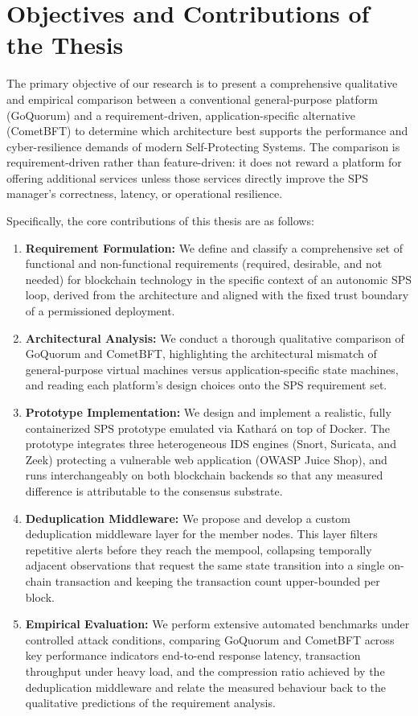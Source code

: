 \section{Objectives and Contributions of the Thesis}
\label{sec:intro_objectives}

The primary objective of our research is to present a comprehensive qualitative and empirical comparison between a conventional general-purpose platform (GoQuorum) and a requirement-driven, application-specific alternative (CometBFT) to determine which architecture best supports the performance and cyber-resilience demands of modern Self-Protecting Systems. The comparison is requirement-driven rather than feature-driven: it does not reward a platform for offering additional services unless those services directly improve the SPS manager's correctness, latency, or operational resilience.

Specifically, the core contributions of this thesis are as follows:
\begin{enumerate}
    \item \textbf{Requirement Formulation:} We define and classify a comprehensive set of functional and non-functional requirements (required, desirable, and not needed) for blockchain technology in the specific context of an autonomic SPS loop, derived from the architecture and aligned with the fixed trust boundary of a permissioned deployment.
    \item \textbf{Architectural Analysis:} We conduct a thorough qualitative comparison of GoQuorum and CometBFT, highlighting the architectural mismatch of general-purpose virtual machines versus application-specific state machines, and reading each platform's design choices onto the SPS requirement set.
    \item \textbf{Prototype Implementation:} We design and implement a realistic, fully containerized SPS prototype emulated via Kathará on top of Docker. The prototype integrates three heterogeneous IDS engines (Snort, Suricata, and Zeek) protecting a vulnerable web application (OWASP Juice Shop), and runs interchangeably on both blockchain backends so that any measured difference is attributable to the consensus substrate.
    \item \textbf{Deduplication Middleware:} We propose and develop a custom deduplication middleware layer for the member nodes. This layer filters repetitive alerts before they reach the mempool, collapsing temporally adjacent observations that request the same state transition into a single on-chain transaction and keeping the transaction count upper-bounded per block.
    \item \textbf{Empirical Evaluation:} We perform extensive automated benchmarks under controlled attack conditions, comparing GoQuorum and CometBFT across key performance indicators end-to-end response latency, transaction throughput under heavy load, and the compression ratio achieved by the deduplication middleware and relate the measured behaviour back to the qualitative predictions of the requirement analysis.
\end{enumerate}

